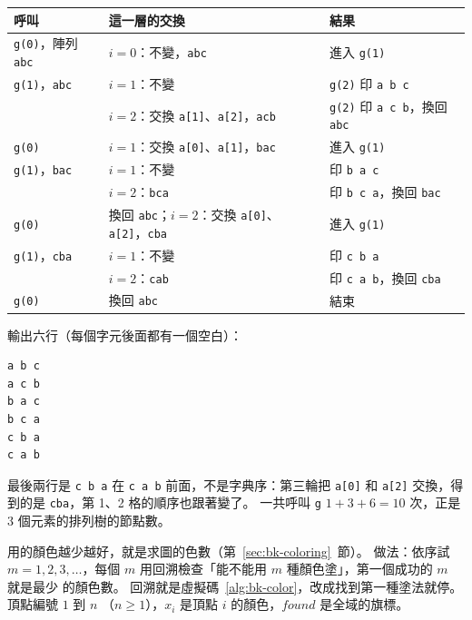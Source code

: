 \begin{center}
\begin{tabular}{lll}
\toprule
呼叫 & 這一層的交換 & 結果 \\
\midrule
\texttt{g(0)}，陣列 \texttt{abc} & $i = 0$：不變，\texttt{abc} & 進入 \texttt{g(1)} \\
\quad \texttt{g(1)}，\texttt{abc} & $i = 1$：不變 & \texttt{g(2)} 印 \texttt{a b c} \\
 & $i = 2$：交換 \texttt{a[1]}、\texttt{a[2]}，\texttt{acb} & \texttt{g(2)} 印 \texttt{a c b}，換回 \texttt{abc} \\
\texttt{g(0)} & $i = 1$：交換 \texttt{a[0]}、\texttt{a[1]}，\texttt{bac} & 進入 \texttt{g(1)} \\
\quad \texttt{g(1)}，\texttt{bac} & $i = 1$：不變 & 印 \texttt{b a c} \\
 & $i = 2$：\texttt{bca} & 印 \texttt{b c a}，換回 \texttt{bac} \\
\texttt{g(0)} & 換回 \texttt{abc}；$i = 2$：交換 \texttt{a[0]}、\texttt{a[2]}，\texttt{cba} & 進入 \texttt{g(1)} \\
\quad \texttt{g(1)}，\texttt{cba} & $i = 1$：不變 & 印 \texttt{c b a} \\
 & $i = 2$：\texttt{cab} & 印 \texttt{c a b}，換回 \texttt{cba} \\
\texttt{g(0)} & 換回 \texttt{abc} & 結束 \\
\bottomrule
\end{tabular}
\end{center}

輸出六行（每個字元後面都有一個空白）：

\noindent\begin{minipage}{\linewidth}
\begin{verbatim}
a b c
a c b
b a c
b c a
c b a
c a b
\end{verbatim}
\end{minipage}
最後兩行是 \texttt{c b a} 在 \texttt{c a b} 前面，不是字典序：第三輪把 \texttt{a[0]} 和
\texttt{a[2]} 交換，得到的是 \texttt{cba}，第 1、2 格的順序也跟著變了。 一共呼叫 \texttt{g}
$1 + 3 + 6 = 10$ 次，正是 $3$ 個元素的排列樹的節點數。

用的顏色越少越好，就是求圖的色數（第~\ref{sec:bk-coloring}~節）。 做法：依序試
$m = 1, 2, 3, \ldots$，每個 $m$ 用回溯檢查「能不能用 $m$ 種顏色塗」，第一個成功的 $m$ 就是最少
的顏色數。 回溯就是虛擬碼~\ref{alg:bk-color}，改成找到第一種塗法就停。 頂點編號 $1$ 到 $n$
（$n \ge 1$），$x_i$ 是頂點 $i$ 的顏色，$\mathit{found}$ 是全域的旗標。

